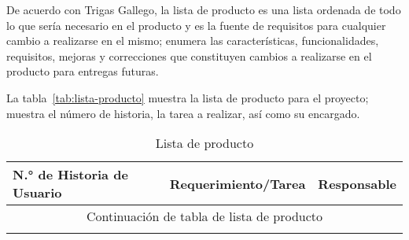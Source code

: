 De acuerdo con Trigas Gallego\cite{gallego_metodologiscrum_2020}, la lista de producto es una lista ordenada de todo lo que sería necesario en el producto y es la fuente de requisitos para cualquier cambio a realizarse en el mismo; enumera las características, funcionalidades, requisitos, mejoras y correcciones que constituyen cambios a realizarse en el producto para entregas futuras.

La tabla~\ref{tab:lista-producto} muestra la lista de producto para el proyecto; muestra el número de historia, la tarea a realizar, así como su encargado.


\begin{longtable}{ p{2cm} | p{10cm} | p{2cm} }
	\hline
	N.° de Historia de Usuario & Requerimiento/Tarea & Responsable \\[0.5cm]
	\hline
	\hline

	\endfirsthead

	\multicolumn{3}{c}{Continuación de tabla de lista de producto }\\
	\hline
	\hline
	\endhead

	\hline
	\hline
	\caption{Lista de producto}
	\endlastfoot



\end{longtable}
